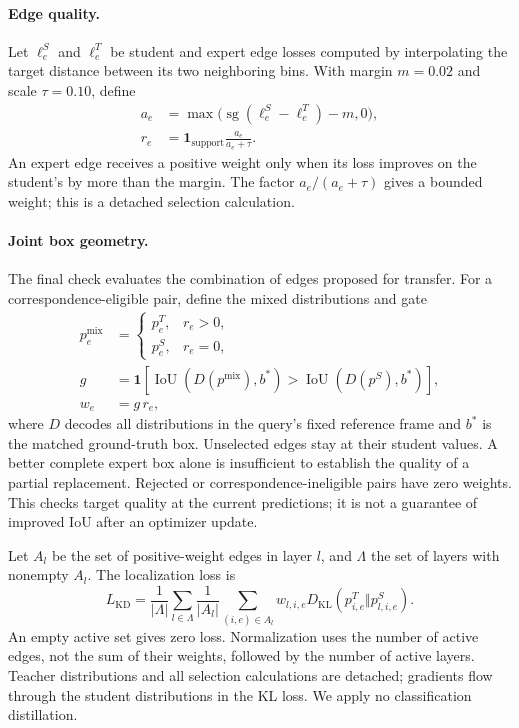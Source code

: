 \paragraph{Edge quality.}
Let $\ell^S_e$ and $\ell^T_e$ be student and expert edge losses computed by interpolating the target distance between its two neighboring bins. With margin $m=0.02$ and scale $\tau=0.10$, define
\begin{equation}
\begin{aligned}
a_e&=\max\bigl(\operatorname{sg}(\ell^S_e-\ell^T_e)-m,0\bigr),\\
r_e&=\mathbf{1}_{\mathrm{support}}\frac{a_e}{a_e+\tau}.
\end{aligned}
\label{eq:edgeweight}
\end{equation}
An expert edge receives a positive weight only when its loss improves on the student's by more than the margin. The factor $a_e/(a_e+\tau)$ gives a bounded weight; this is a detached selection calculation.

\paragraph{Joint box geometry.}
The final check evaluates the combination of edges proposed for transfer. For a correspondence-eligible pair, define the mixed distributions and gate
\begin{equation}
\begin{aligned}
p^{\mathrm{mix}}_e&=\begin{cases}
p^T_e,&r_e>0,\\
p^S_e,&r_e=0,
\end{cases}\\
g&=\mathbf{1}\!\left[
\operatorname{IoU}(D(p^{\mathrm{mix}}),b^*)>
\operatorname{IoU}(D(p^S),b^*)\right],\\
w_e&=g\,r_e ,
\end{aligned}
\label{eq:mixed}
\end{equation}
where $D$ decodes all distributions in the query's fixed reference frame and $b^*$ is the matched ground-truth box. Unselected edges stay at their student values. A better complete expert box alone is insufficient to establish the quality of a partial replacement. Rejected or correspondence-ineligible pairs have zero weights. This checks target quality at the current predictions; it is not a guarantee of improved IoU after an optimizer update.

Let $A_l$ be the set of positive-weight edges in layer $l$, and $\Lambda$ the set of layers with nonempty $A_l$. The localization loss is
\begin{equation}
L_{\mathrm{KD}}=\frac{1}{|\Lambda|}\sum_{l\in\Lambda}
\frac{1}{|A_l|}\sum_{(i,e)\in A_l}
w_{l,i,e}D_{\mathrm{KL}}\!\left(p^T_{i,e}\Vert p^S_{l,i,e}\right).
\label{eq:kd}
\end{equation}
An empty active set gives zero loss. Normalization uses the number of active edges, not the sum of their weights, followed by the number of active layers. Teacher distributions and all selection calculations are detached; gradients flow through the student distributions in the KL loss. We apply no classification distillation.

